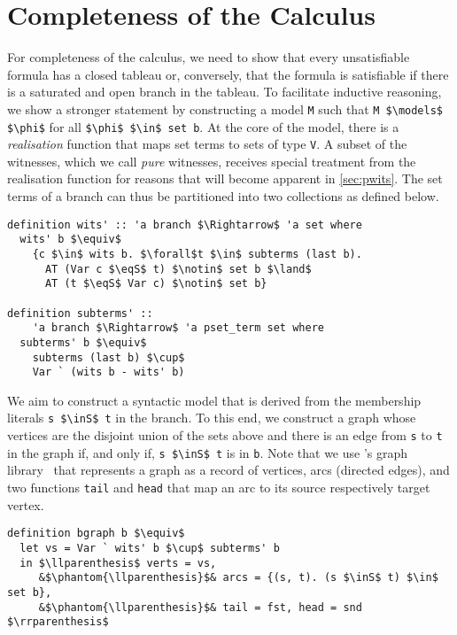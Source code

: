 \documentclass[sigplan,10pt,anonymous,review]{acmart}
\newcommand{\inS}{\in_\text{s}}
\newcommand{\eqS}{=_\text{s}}
\begin{document}
\section{Completeness of the Calculus\label{sec:complete}}
For completeness of the calculus, we need to show that every unsatisfiable formula has a closed tableau or, conversely, that the formula is satisfiable if there is a saturated and open branch in the tableau.
To facilitate inductive reasoning, we show a stronger statement by constructing a model \lstinline!M! such that \lstinline!M $\models$ $\phi$! for all \lstinline!$\phi$ $\in$ set b!.
At the core of the model, there is a \textit{realisation} function that maps set terms to sets of type \lstinline!V!.
A subset of the witnesses, which we call \textit{pure} witnesses, receives special treatment from the realisation function for reasons that will become apparent in \autoref{sec:pwits}.
The set terms of a branch can thus be partitioned into two collections as defined below.
\begin{lstlisting}
definition wits' :: 'a branch $\Rightarrow$ 'a set where
  wits' b $\equiv$
    {c $\in$ wits b. $\forall$t $\in$ subterms (last b).
      AT (Var c $\eqS$ t) $\notin$ set b $\land$
      AT (t $\eqS$ Var c) $\notin$ set b} 

definition subterms' ::
    'a branch $\Rightarrow$ 'a pset_term set where
  subterms' b $\equiv$
    subterms (last b) $\cup$ 
    Var ` (wits b - wits' b)
\end{lstlisting}

We aim to construct a syntactic model that is derived from the membership literals \lstinline!s $\inS$ t! in the branch.
To this end, we construct a graph whose vertices are the disjoint union of the sets above and there is an edge from \lstinline!s! to \lstinline!t! in the graph if, and only if, \lstinline!s $\inS$ t! is in \lstinline!b!.
Note that we use \citeauthor{graph_theory_afp}'s graph library~\cite{graph_theory_afp} that represents a graph as a record of vertices, arcs (directed edges), and two functions \lstinline!tail! and \lstinline!head! that map an arc to its source respectively target vertex.
\begin{lstlisting}
definition bgraph b $\equiv$
  let vs = Var ` wits' b $\cup$ subterms' b
  in $\llparenthesis$ verts = vs,
     &$\phantom{\llparenthesis}$& arcs = {(s, t). (s $\inS$ t) $\in$ set b},
     &$\phantom{\llparenthesis}$& tail = fst, head = snd $\rrparenthesis$
\end{lstlisting}
\end{document}
